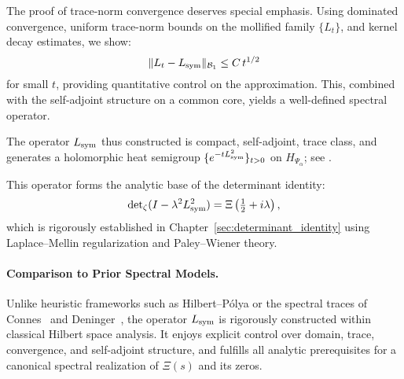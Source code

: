 \medskip

\noindent
The proof of trace-norm convergence deserves special emphasis. Using dominated convergence, uniform trace-norm bounds on the mollified family \( \{L_t\} \), and kernel decay estimates, we show:
\[
  \|L_t - L_{\mathrm{sym}}\|_{\mathcal{B}_1} \le C\,t^{1/2}
\]
for small \( t \), providing quantitative control on the approximation. This, combined with the self-adjoint structure on a common core, yields a well-defined spectral operator.

\medskip

The operator \( L_{\mathrm{sym}} \) thus constructed is compact, self-adjoint, trace class, and generates a holomorphic heat semigroup \( \{e^{-t L_{\mathrm{sym}}^2}\}_{t > 0} \) on \( H_{\Psi_\alpha} \); see .

\medskip

\noindent
This operator forms the analytic base of the determinant identity:
\[
\det\nolimits_{\zeta}(I - \lambda^2 L_{\mathrm{sym}}^2) = \Xi\left(\tfrac{1}{2} + i\lambda\right),
\]
which is rigorously established in Chapter~\ref{sec:determinant_identity} using Laplace–Mellin regularization and Paley--Wiener theory.

\paragraph{Comparison to Prior Spectral Models.}
Unlike heuristic frameworks such as Hilbert--Pólya or the spectral traces of Connes~\cite{Connes1999TraceFormula} and Deninger~\cite{Deninger1998Frobenius}, the operator \( L_{\mathrm{sym}} \) is rigorously constructed within classical Hilbert space analysis. It enjoys explicit control over domain, trace, convergence, and self-adjoint structure, and fulfills all analytic prerequisites for a canonical spectral realization of \( \Xi(s) \) and its zeros.
